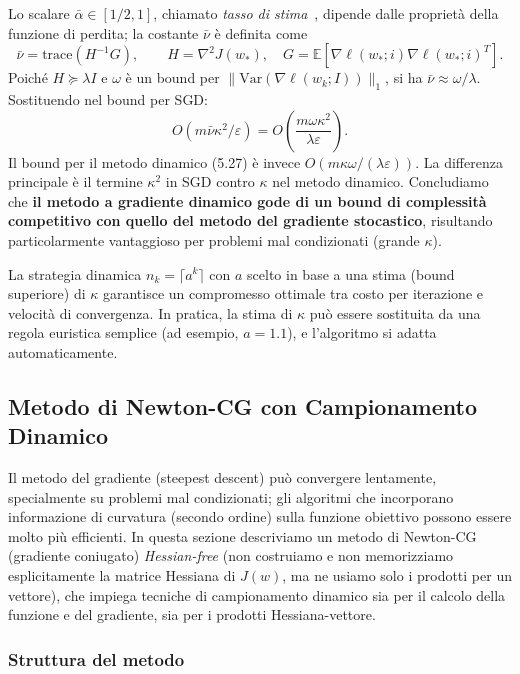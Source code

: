 \documentclass[a4paper,12pt]{article}
\numberwithin{equation}{section}
\numberwithin{figure}{section}
\numberwithin{table}{section}
\begin{document}
Lo scalare \(\bar{\alpha} \in [1/2, 1]\), chiamato \textit{tasso di stima}~\cite{bottou2008}, dipende dalle proprietà della funzione di perdita; la costante \(\bar{\nu}\) è definita come
\[
\bar{\nu} = \mathrm{trace}(H^{-1}G), \qquad H = \nabla^2 J(w_*), \quad G = \mathbb{E}[\nabla \ell(w_*; i) \nabla \ell(w_*; i)^T]. \tag{5.29}
\]
Poiché \(H \succeq \lambda I\) e \(\omega\) è un bound per \(\|\mathrm{Var}(\nabla \ell(w_k;I))\|_1\), si ha \(\bar{\nu} \approx \omega/\lambda\). Sostituendo nel bound per SGD:
\[
O(m\bar{\nu}\kappa^2/\varepsilon) = O\!\left(\frac{m \omega \kappa^2}{\lambda \varepsilon}\right). \tag{5.30}
\]
Il bound per il metodo dinamico (5.27) è invece \(O(m\kappa\omega/(\lambda\varepsilon))\). La differenza principale è il termine \(\kappa^2\) in SGD contro \(\kappa\) nel metodo dinamico. Concludiamo che \textbf{il metodo a gradiente dinamico gode di un bound di complessità competitivo con quello del metodo del gradiente stocastico}, risultando particolarmente vantaggioso per problemi mal condizionati (grande \(\kappa\)).

La strategia dinamica \(n_k = \lceil a^k \rceil\) con \(a\) scelto in base a una stima (bound superiore) di \(\kappa\) garantisce un compromesso ottimale tra costo per iterazione e velocità di convergenza. In pratica, la stima di \(\kappa\) può essere sostituita da una regola euristica semplice (ad esempio, \(a=1.1\)), e l'algoritmo si adatta automaticamente.

\newpage
\subsection{Metodo di Newton-CG con Campionamento Dinamico}

Il metodo del gradiente (steepest descent) può convergere lentamente, specialmente su problemi mal condizionati; gli algoritmi che incorporano informazione di curvatura (secondo ordine) sulla funzione obiettivo possono essere molto più efficienti. In questa sezione descriviamo un metodo di Newton-CG (gradiente coniugato) \emph{Hessian-free} (non costruiamo e non memorizziamo esplicitamente la matrice Hessiana di $J(w)$, ma ne usiamo solo i prodotti per un vettore), che impiega tecniche di campionamento dinamico sia per il calcolo della funzione e del gradiente, sia per i prodotti Hessiana-vettore.

\subsubsection{Struttura del metodo}
\end{document}
